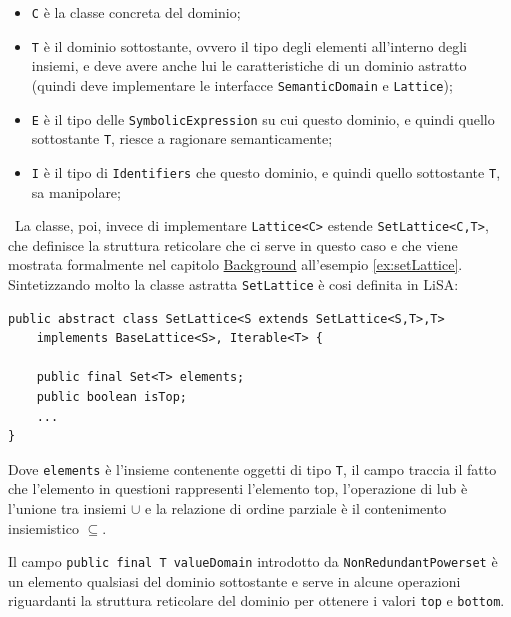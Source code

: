 \begin{itemize}
    \itemsep0pt
    \item \texttt{C} è la classe concreta del dominio;
    \item \texttt{T} è il dominio sottostante, ovvero il tipo degli elementi all'interno degli insiemi, e deve avere anche lui le caratteristiche di un dominio astratto (quindi deve implementare le interfacce \texttt{SemanticDomain} e \texttt{Lattice});
    \item \texttt{E} è il tipo delle \texttt{SymbolicExpression} su cui questo dominio, e quindi quello sottostante \texttt{T}, riesce a ragionare semanticamente;
    \item \texttt{I} è il tipo di \texttt{Identifiers} che questo dominio,  e quindi quello sottostante \texttt{T}, sa manipolare;
\end{itemize}\ 
La classe, poi, invece di implementare \texttt{Lattice<C>} estende \texttt{SetLattice<C,T>}, che definisce la struttura reticolare che ci serve in questo caso e che viene mostrata formalmente nel capitolo \hyperref[chapter:background]{Background} all'esempio \ref{ex:setLattice}. Sintetizzando molto la classe astratta \texttt{SetLattice} è cosi definita in LiSA:
\begin{lstlisting}[belowskip=-1.3 \baselineskip]
public abstract class SetLattice<S extends SetLattice<S,T>,T> 
    implements BaseLattice<S>, Iterable<T> {

    public final Set<T> elements;
    public boolean isTop;
    ...
}
\end{lstlisting}
Dove \texttt{elements} è l'insieme contenente oggetti di tipo \texttt{T}, il campo  traccia il fatto che l'elemento in questioni rappresenti l'elemento top, l'operazione di lub è l'unione tra insiemi \(\cup\) e la relazione di ordine parziale è il contenimento insiemistico \(\subseteq\).

Il campo \texttt{public final T valueDomain} introdotto da \texttt{NonRedundantPowerset} è un elemento qualsiasi del dominio sottostante e serve in alcune operazioni riguardanti la struttura reticolare del dominio per ottenere i valori \texttt{top} e \texttt{bottom}. 




